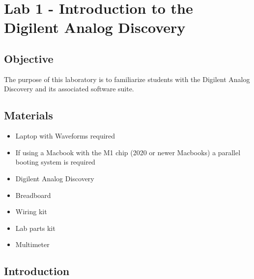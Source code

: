 \chapter{Lab 1 - Introduction to the Digilent Analog Discovery}
\section{Objective}

The purpose of this laboratory is to familiarize students with the Digilent Analog Discovery and its associated software suite. 

%
%

\section{Materials}

\begin{itemize}
	\item Laptop with Waveforms required
	\item If using a Macbook with the M1 chip (2020 or newer Macbooks) a parallel booting system is required
	\item Digilent Analog Discovery
	\item Breadboard
	\item Wiring kit
	\item Lab parts kit
	\item Multimeter
\end{itemize}

\section{Introduction}


